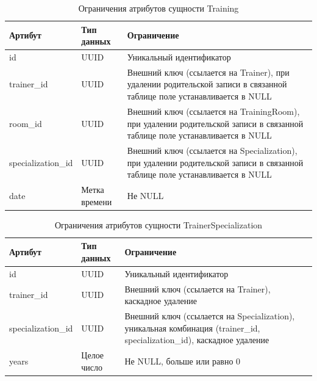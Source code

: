 \begin{table}[H]
	\centering
	\begin{tabular}{|p{3.5cm}|p{3.5cm}|p{8.5cm}|}
		\hline
		\textbf{Артибут}             & \textbf{Тип данных}   & \textbf{Ограничение}             \\ \hline
		id                            & UUID                & Уникальный идентификатор         \\ \hline
		trainer\_id                   & UUID                  & Внешний ключ (ссылается на Trainer), при удалении родительской записи в связанной таблице поле устанавливается в NULL \\ \hline
		room\_id                      & UUID                 & Внешний ключ (ссылается на TrainingRoom), при удалении родительской записи в связанной таблице поле устанавливается в NULL\\ \hline
		specialization\_id                      & UUID                 & Внешний ключ (ссылается на Specialization), при удалении родительской записи в связанной таблице поле устанавливается в NULL\\ \hline
		date                   & Метка времени                & Не NULL \\ \hline
	\end{tabular}
	\caption{Ограничения атрибутов сущности Training}
\end{table}

\begin{table}[H]
	\centering
	\begin{tabular}{|p{3.5cm}|p{3.5cm}|p{8.5cm}|}
		\hline
		\textbf{Артибут}             & \textbf{Тип данных}   & \textbf{Ограничение}             \\ \hline
		id                            & UUID                  & Уникальный идентификатор         \\ \hline
		trainer\_id                   & UUID                & Внешний ключ (ссылается на Trainer), каскадное удаление \\ \hline
		specialization\_id            & UUID                 & Внешний ключ (ссылается на Specialization), уникальная комбинация (trainer\_id, specialization\_id), каскадное удаление \\ \hline
		years                         & Целое число                   & Не NULL, больше или равно 0      \\ \hline
	\end{tabular}
	\caption{Ограничения атрибутов сущности TrainerSpecialization}
\end{table}

